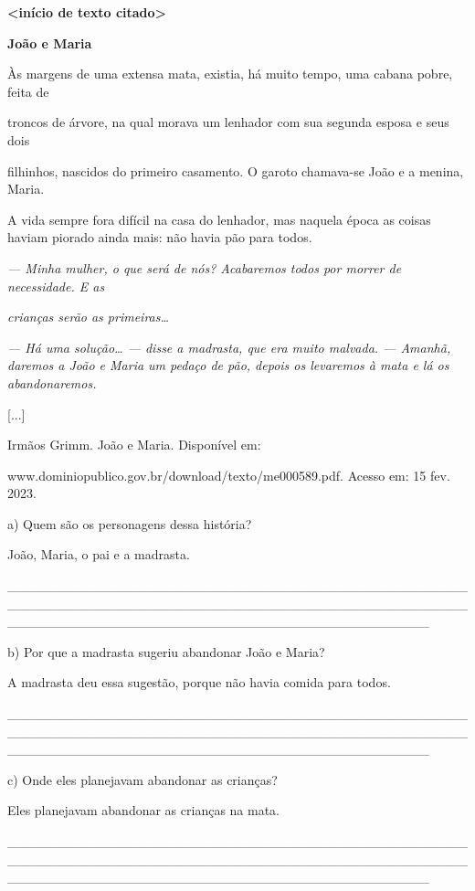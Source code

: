 \textbf{\textless{}início de texto citado\textgreater{}}

\textbf{João e Maria}

Às margens de uma extensa mata, existia, há muito tempo, uma cabana
pobre, feita de

troncos de árvore, na qual morava um lenhador com sua segunda esposa e
seus dois

filhinhos, nascidos do primeiro casamento. O garoto chamava-se João e a
menina, Maria.

A vida sempre fora difícil na casa do lenhador, mas naquela época as
coisas haviam piorado ainda mais: não havia pão para todos.

\emph{--- Minha mulher, o que será de nós? Acabaremos todos por morrer
de necessidade. E as}

\emph{crianças serão as primeiras\ldots{}}

\emph{--- Há uma solução\ldots{} --- disse a madrasta, que era muito
malvada. --- Amanhã, daremos a João e Maria um pedaço de pão, depois os
levaremos à mata e lá os abandonaremos.}

{[}...{]}

Irmãos Grimm. João e Maria. Disponível em:

www.dominiopublico.gov.br/download/texto/me000589.pdf. Acesso em: 15
fev. 2023.

a) Quem são os personagens dessa história?

João, Maria, o pai e a madrasta.

\_\_\_\_\_\_\_\_\_\_\_\_\_\_\_\_\_\_\_\_\_\_\_\_\_\_\_\_\_\_\_\_\_\_\_\_\_\_\_\_\_\_\_\_\_\_\_\_\_\_\_\_\_\_\_\_\_\_\_\_\_\_\_\_\_\_\_\_\_\_\_\_\_\_\_\_\_\_\_\_\_\_\_\_\_\_\_\_\_\_\_\_\_\_\_\_\_\_\_\_\_\_\_\_\_\_\_\_\_\_\_\_\_\_\_\_\_\_\_\_\_\_\_\_\_\_\_\_\_\_\_\_\_\_\_\_\_\_\_\_

b) Por que a madrasta sugeriu abandonar João e Maria?

A madrasta deu essa sugestão, porque não havia comida para todos.

\_\_\_\_\_\_\_\_\_\_\_\_\_\_\_\_\_\_\_\_\_\_\_\_\_\_\_\_\_\_\_\_\_\_\_\_\_\_\_\_\_\_\_\_\_\_\_\_\_\_\_\_\_\_\_\_\_\_\_\_\_\_\_\_\_\_\_\_\_\_\_\_\_\_\_\_\_\_\_\_\_\_\_\_\_\_\_\_\_\_\_\_\_\_\_\_\_\_\_\_\_\_\_\_\_\_\_\_\_\_\_\_\_\_\_\_\_\_\_\_\_\_\_\_\_\_\_\_\_\_\_\_\_\_\_\_\_\_\_\_

c) Onde eles planejavam abandonar as crianças?

Eles planejavam abandonar as crianças na mata.

\_\_\_\_\_\_\_\_\_\_\_\_\_\_\_\_\_\_\_\_\_\_\_\_\_\_\_\_\_\_\_\_\_\_\_\_\_\_\_\_\_\_\_\_\_\_\_\_\_\_\_\_\_\_\_\_\_\_\_\_\_\_\_\_\_\_\_\_\_\_\_\_\_\_\_\_\_\_\_\_\_\_\_\_\_\_\_\_\_\_\_\_\_\_\_\_\_\_\_\_\_\_\_\_\_\_\_\_\_\_\_\_\_\_\_\_\_\_\_\_\_\_\_\_\_\_\_\_\_\_\_\_\_\_\_\_\_\_\_\_

